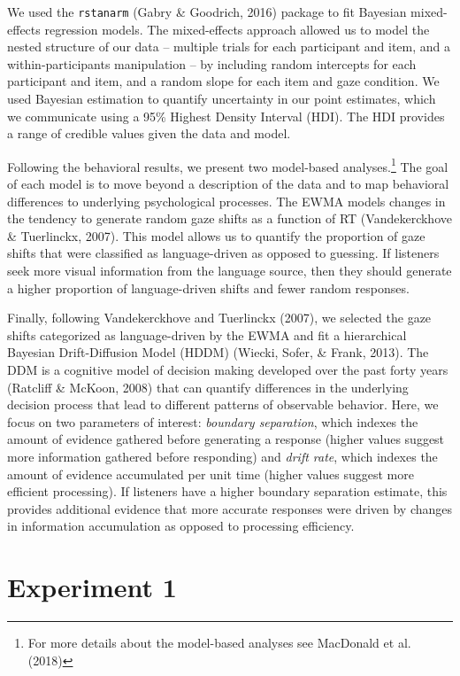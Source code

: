\documentclass[man,floatsintext]{apa6}
\let\rmarkdownfootnote\footnote%
\def\footnote{\protect\rmarkdownfootnote}
\theoremstyle{definition}
\theoremstyle{definition}
\theoremstyle{definition}
\theoremstyle{remark}
\begin{document}
We used the \texttt{rstanarm} (Gabry \& Goodrich, 2016) package to fit
Bayesian mixed-effects regression models. The mixed-effects approach
allowed us to model the nested structure of our data -- multiple trials
for each participant and item, and a within-participants manipulation --
by including random intercepts for each participant and item, and a
random slope for each item and gaze condition. We used Bayesian
estimation to quantify uncertainty in our point estimates, which we
communicate using a 95\% Highest Density Interval (HDI). The HDI
provides a range of credible values given the data and model.

Following the behavioral results, we present two model-based
analyses.\footnote{For more details about the model-based analyses see
  MacDonald et al. (2018)} The goal of each model is to move beyond a
description of the data and to map behavioral differences to underlying
psychological processes. The EWMA models changes in the tendency to
generate random gaze shifts as a function of RT (Vandekerckhove \&
Tuerlinckx, 2007). This model allows us to quantify the proportion of
gaze shifts that were classified as language-driven as opposed to
guessing. If listeners seek more visual information from the language
source, then they should generate a higher proportion of language-driven
shifts and fewer random responses.

Finally, following Vandekerckhove and Tuerlinckx (2007), we selected the
gaze shifts categorized as language-driven by the EWMA and fit a
hierarchical Bayesian Drift-Diffusion Model (HDDM) (Wiecki, Sofer, \&
Frank, 2013). The DDM is a cognitive model of decision making developed
over the past forty years (Ratcliff \& McKoon, 2008) that can quantify
differences in the underlying decision process that lead to different
patterns of observable behavior. Here, we focus on two parameters of
interest: \emph{boundary separation}, which indexes the amount of
evidence gathered before generating a response (higher values suggest
more information gathered before responding) and \emph{drift rate},
which indexes the amount of evidence accumulated per unit time (higher
values suggest more efficient processing). If listeners have a higher
boundary separation estimate, this provides additional evidence that
more accurate responses were driven by changes in information
accumulation as opposed to processing efficiency.

\section{Experiment 1}\label{experiment-1}
\end{document}
